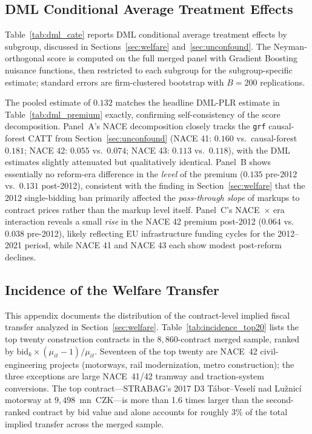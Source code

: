 \documentclass[11pt]{article}
\begin{document}
\subsection{DML Conditional Average Treatment Effects}\label{app:dml_cate}

Table~\ref{tab:dml_cate} reports DML conditional average treatment effects by subgroup, discussed in Sections~\ref{sec:welfare} and~\ref{sec:unconfound}. The Neyman-orthogonal score is computed on the full merged panel with Gradient Boosting nuisance functions, then restricted to each subgroup for the subgroup-specific estimate; standard errors are firm-clustered bootstrap with $B = 200$ replications.



The pooled estimate of $0.132$ matches the headline DML-PLR estimate in Table~\ref{tab:dml_premium} exactly, confirming self-consistency of the score decomposition. Panel~A's NACE decomposition closely tracks the \texttt{grf} causal-forest CATT from Section~\ref{sec:unconfound} (NACE 41: $0.160$ vs.\ causal-forest $0.181$; NACE 42: $0.055$ vs.\ $0.074$; NACE 43: $0.113$ vs.\ $0.118$), with the DML estimates slightly attenuated but qualitatively identical. Panel~B shows essentially no reform-era difference in the \emph{level} of the premium ($0.135$ pre-2012 vs.\ $0.131$ post-2012), consistent with the finding in Section~\ref{sec:welfare} that the 2012 single-bidding ban primarily affected the \emph{pass-through slope} of markups to contract prices rather than the markup level itself. Panel~C's NACE~$\times$ era interaction reveals a small \emph{rise} in the NACE 42 premium post-2012 ($0.064$ vs.\ $0.038$ pre-2012), likely reflecting EU infrastructure funding cycles for the 2012--2021 period, while NACE 41 and NACE 43 each show modest post-reform declines.


\subsection{Incidence of the Welfare Transfer}\label{app:incidence}

This appendix documents the distribution of the contract-level implied fiscal transfer analyzed in Section~\ref{sec:welfare}. Table~\ref{tab:incidence_top20} lists the top twenty construction contracts in the $8{,}860$-contract merged sample, ranked by $\text{bid}_k \times (\mu_{it}-1)/\mu_{it}$. Seventeen of the top twenty are NACE~42 civil-engineering projects (motorways, rail modernization, metro construction); the three exceptions are large NACE~41/42 tramway and traction-system conversions. The top contract---STRABAG's 2017 D3 Tábor--Veselí nad Lužnicí motorway at $9{,}498$~mn~CZK---is more than 1.6 times larger than the second-ranked contract by bid value and alone accounts for roughly $3\%$ of the total implied transfer across the merged sample.
\end{document}
